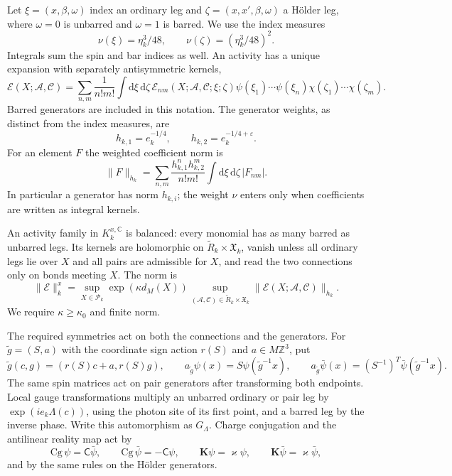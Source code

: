 \documentclass[11pt,letterpaper,reqno]{amsart}
\newcommand{\C}{\mathbb C}
\newcommand{\Z}{\mathbb Z}
\newcommand{\dd}{\mathrm d}
\begin{document}
Let $\xi=(x,\beta,\omega)$ index an ordinary leg and
$\zeta=(x,x',\beta,\omega)$ a H\"older leg, where
$\omega=0$ is unbarred and $\omega=1$ is barred.
We use the index measures
\[
 \nu(\xi)=\eta_k^3/48,\qquad
 \nu(\zeta)=(\eta_k^3/48)^2.
\]
Integrals sum the spin and bar indices as well. An activity
has a unique expansion with separately antisymmetric kernels,
\begin{equation}\label{eq:rg-activity-kernels}
 \mathscr E(X;\mathscr A,\mathscr C)
 =\sum_{n,m}\frac1{n!m!}\int\dd\xi\,\dd\zeta\,
      \mathscr E_{nm}(X;\mathscr A,\mathscr C;\xi;\zeta)
                       \psi(\xi_1)\cdots\psi(\xi_n)
                       \chi(\zeta_1)\cdots\chi(\zeta_m).
\end{equation}
Barred generators are included in this notation.
The generator weights, as distinct from the index measures, are
\[
 h_{k,1}=e_k^{-1/4},\qquad h_{k,2}=e_k^{-1/4+\varepsilon}.
\]
For an element $F$ the weighted coefficient norm is
\begin{equation}\label{eq:rg-activity-coefficient-norm}
 \|F\|_{h_k}
       =\sum_{n,m}\frac{h_{k,1}^nh_{k,2}^m}{n!m!}
                                   \int\dd\xi\,\dd\zeta\,|F_{nm}|.
\end{equation}
In particular a generator has norm $h_{k,i}$;
the weight $\nu$ enters only when coefficients are written as
integral kernels.

An activity family in $K_k^{x,\C}$ is balanced: every monomial
has as many barred as unbarred legs. Its kernels are holomorphic
on $\widetilde R_k\times\mathfrak X_k$, vanish unless all ordinary
legs lie over $X$ and all pairs are admissible for $X$, and read
the two connections only on bonds meeting $X$. The norm is
\begin{equation}\label{eq:rg-activity-norm}
 \|\mathscr E\|_k^x
  =\sup_{X\in\mathcal P_k}\exp(\kappa d_M(X))
    \sup_{(\mathscr A,\mathscr C)\in\widetilde R_k\times\mathfrak X_k}
                          \|\mathscr E(X;\mathscr A,\mathscr C)\|_{h_k}.
\end{equation}
We require $\kappa\ge\kappa_0$ and finite norm.

The required symmetries act on both the connections and the
generators. For $\tilde g=(S,a)$ with the coordinate sign action
$r(S)$ and $a\in M\Z^3$, put
\[
 \tilde g(c,g)=(r(S)c+a,r(S)g),\qquad
 a_{\tilde g}\psi(x)=S\psi(\tilde g^{-1}x),\qquad
 a_{\tilde g}\bar\psi(x)=(S^{-1})^T\bar\psi(\tilde g^{-1}x).
\]
The same spin matrices act on pair generators after transforming
both endpoints. Local gauge transformations multiply an unbarred
ordinary or pair leg by $\exp(ie_k\Lambda(c))$, using the photon
site of its first point, and a barred leg by the inverse phase.
Write this automorphism as $G_\Lambda$.
Charge conjugation and the antilinear reality map act by
\[
 \mathrm{Cg}\,\psi=\mathsf C\bar\psi,\qquad
 \mathrm{Cg}\,\bar\psi=-\mathsf C\psi,\qquad
 \mathbf K\psi=\varkappa\psi,\qquad
 \mathbf K\bar\psi=\varkappa\bar\psi,
\]
and by the same rules on the H\"older generators.
\end{document}
